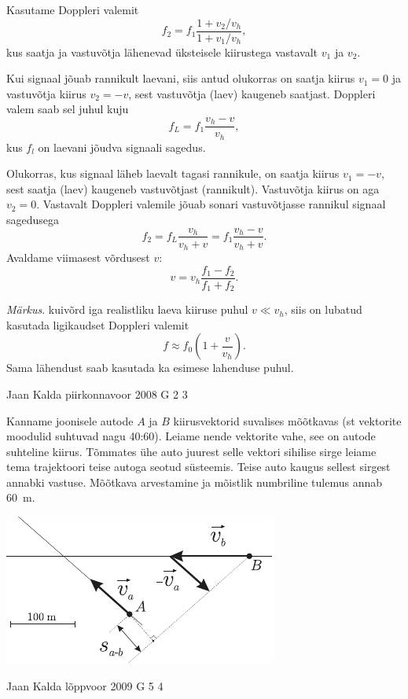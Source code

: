 \documentclass[11pt]{article}
\begin{document}
{{Kasutame Doppleri valemit
\[
f_2 = f_1 \frac{1+v_2/v_h}{1+v_1/v_h},
\]
kus saatja ja vastuvõtja lähenevad üksteisele kiirustega vastavalt $v_1$ ja $v_2$.

Kui signaal jõuab rannikult laevani, siis antud olukorras on saatja kiirus $v_1 = 0$ ja vastuvõtja kiirus $v_2 = -v$, sest vastuvõtja (laev) kaugeneb saatjast. Doppleri valem saab sel juhul kuju
\[
f_L = f_1 \frac{v_h-v}{v_h}, 
\]
kus $f_l$ on laevani jõudva signaali sagedus.

Olukorras, kus signaal läheb laevalt tagasi rannikule, on saatja kiirus $v_1 = -v$, sest saatja (laev) kaugeneb vastuvõtjast (rannikult). Vastuvõtja kiirus on aga $v_2 = 0$. Vastavalt Doppleri valemile jõuab sonari vastuvõtjasse rannikul signaal sagedusega
\[
f_2 = f_L \frac{v_h}{v_h+v} = f_1 \frac{v_h-v}{v_h+v}. 
\]
Avaldame viimasest võrdusest $v$:
\[
v = v_h \frac{f_1-f_2}{f_1+f_2}. 
\]

\emph{Märkus}. kuivõrd iga realistliku laeva kiiruse puhul $v \ll v_h$, siis on lubatud
kasutada ligikaudset Doppleri valemit
\[
f \approx f_0 \left(1+\frac{v}{v_h}\right).
\]
Sama lähendust saab kasutada ka esimese lahenduse puhul.
\fi
}

{Jaan Kalda} %
{piirkonnavoor} %
{2008} %
{G 2} %
{3} %
{

\ifSolution
Kanname joonisele autode $A$ ja $B$ kiirusvektorid suvalises mõõtkavas (st vektorite moodulid suhtuvad nagu 40:60). Leiame nende vektorite vahe, see on autode suhteline kiirus. Tõmmates ühe auto juurest selle vektori sihilise sirge leiame tema trajektoori teise autoga seotud süsteemis. Teise auto kaugus sellest sirgest annabki vastuse. Mõõtkava arvestamine ja mõistlik numbriline tulemus annab \SI{60}{m}.
\begin{center}
	\includegraphics[width=0.7\linewidth]{2008-v2g-02-lah}
\end{center}
\fi
}

{Jaan Kalda} %
{lõppvoor} %
{2009} %
{G 5} %
{4} %
{

}}
\end{document}
